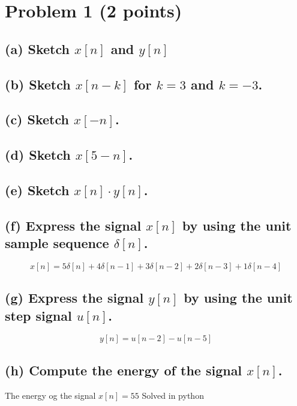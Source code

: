 \section{Problem 1 (2 points)}

\subsection*{(a) Sketch \( x[n] \) and \( y[n] \)}

\subsection*{(b) Sketch \( x[n-k] \) for \( k=3 \) and \( k=-3 \).}

\subsection*{(c) Sketch \( x[-n] \).}

\subsection*{(d) Sketch \( x[5-n] \).}

\subsection*{(e) Sketch \( x[n] \cdot y[n] \).}

\subsection*{(f) Express the signal \( x[n] \) by using the unit sample sequence \( \delta[n] \).}

\begin{equation*}
    x[n] = 5\delta[n] + 4\delta[n-1] + 3\delta[n-2] + 2\delta[n-3] + 1\delta[n-4]
\end{equation*}


\subsection*{(g) Express the signal \( y[n] \) by using the unit step signal \( u[n] \).}

\begin{equation*}
    y[n] = u[n-2] - u[n-5]
\end{equation*}


\subsection*{(h) Compute the energy of the signal \( x[n] \).}
The energy og the signal $x[n] =  55$ Solved in python

